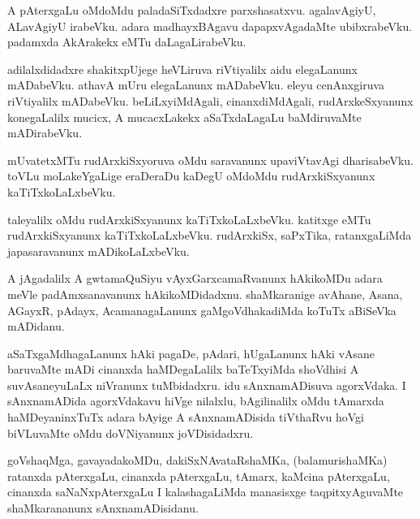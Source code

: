 \documentclass{article}
\begin{document}
\begin{mn}
A  pAterxgaLu  oMdoMdu  paladaSiTxdadxre  parxshasatxvu.  agalavAgiyU,  ALavAgiyU  irabeVku.  adara  
madhayxBAgavu  dapapxvAgadaMte  ubibxrabeVku.  padamxda  AkArakekx  eMTu  daLagaLirabeVku.
\end{mn}

\begin{mn}
adilalxdidadxre  shakitxpUjege  heVLiruva  riVtiyalilx  aidu  elegaLanunx  mADabeVku.  athavA  mUru  
elegaLanunx  mADabeVku.  eleyu  cenAnxgiruva  riVtiyalilx  mADabeVku.  beLiLxyiMdAgali,  cinanxdiMdAgali,  
rudArxkeSxyanunx  konegaLalilx  mucicx,  A  mucacxLakekx  aSaTxdaLagaLu  baMdiruvaMte  mADirabeVku.
\end{mn}

\begin{mn}
mUvatetxMTu  rudArxkiSxyoruva  oMdu  saravanunx  upaviVtavAgi  dharisabeVku.  toVLu  moLakeYgaLige  
eraDeraDu  kaDegU  oMdoMdu  rudArxkiSxyanunx  kaTiTxkoLaLxbeVku.
\end{mn}

\begin{mn}
taleyalilx  oMdu  rudArxkiSxyanunx  kaTiTxkoLaLxbeVku.  katitxge  eMTu  rudArxkiSxyanunx  kaTiTxkoLaLxbeVku.  
rudArxkiSx,  saPxTika,  ratanxgaLiMda  japasaravanunx  mADikoLaLxbeVku.
\end{mn}

\begin{mn}
A  jAgadalilx  A  gwtamaQuSiyu  vAyxGarxcamaRvanunx  hAkikoMDu  adara  meVle  padAmxsanavanunx  hAkikoMDidadxnu.  
shaMkaranige  avAhane, Asana,  AGayxR,  pAdayx,  AcamanagaLanunx  gaMgoVdhakadiMda  koTuTx  aBiSeVka  mADidanu.
\end{mn}

\begin{mn}
aSaTxgaMdhagaLanunx  hAki  pagaDe,  pAdari,  hUgaLanunx  hAki  vAsane  baruvaMte  mADi  cinanxda  haMDegaLalilx  
baTeTxyiMda  shoVdhisi  A  suvAsaneyuLaLx  niVranunx  tuMbidadxru.  idu  sAnxnamADisuva  agorxVdaka.  I  
sAnxnamADida  agorxVdakavu  hiVge  nilalxlu,  bAgilinalilx  oMdu  tAmarxda  haMDeyaninxTuTx  adara  bAyige  A  
sAnxnamADisida  tiVthaRvu  hoVgi  biVLuvaMte  oMdu  doVNiyanunx  joVDisidadxru.
\end{mn}

\begin{mn}
goVshaqMga,  gavayadakoMDu,  dakiSxNAvataRshaMKa,  (balamurishaMKa) ratanxda  pAterxgaLu,  cinanxda  pAterxgaLu,  
tAmarx,  kaMcina  pAterxgaLu,  cinanxda  saNaNxpAterxgaLu  I  kalashagaLiMda  manasisxge  taqpitxyAguvaMte  
shaMkarananunx  sAnxnamADisidanu.
\end{mn}
\end{document}
